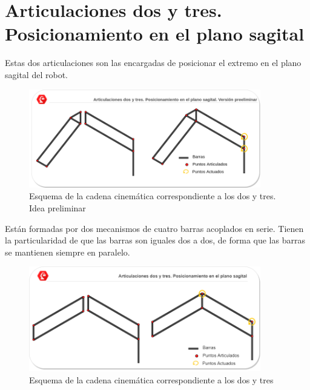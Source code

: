
\section{Articulaciones dos y tres. Posicionamiento en el plano sagital} \label{sec:Mecanica:articulacion_dostres}
    Estas dos articulaciones son las encargadas de posicionar el extremo en el plano sagital del robot.
    \\

    \begin{figure}[H]
       	\centering
       	\includegraphics[width=0.9\textwidth]{figuras/Imagenes_Mecanica/mecanismos_4_barras_triangulo.png}
       	\caption{Esquema de la cadena cinemática correspondiente a los  dos y tres. Idea preliminar}
       	\label{fig:Mecanica:4_bar_mecanism_triangle}
    \end{figure}

    Están formadas por dos mecanismos de cuatro barras acoplados en serie. Tienen la particularidad de que las barras son iguales dos a dos, de forma que las barras se mantienen siempre en paralelo.
    \\

    \begin{figure}[H]
    	\centering
    	\includegraphics[width=0.9\textwidth]{figuras/Imagenes_Mecanica/mecanismos_4_barras.png}
    	\caption{Esquema de la cadena cinemática correspondiente a los  dos y tres}
    	\label{fig:Mecanica:4_bar_mecanism}
    \end{figure}

